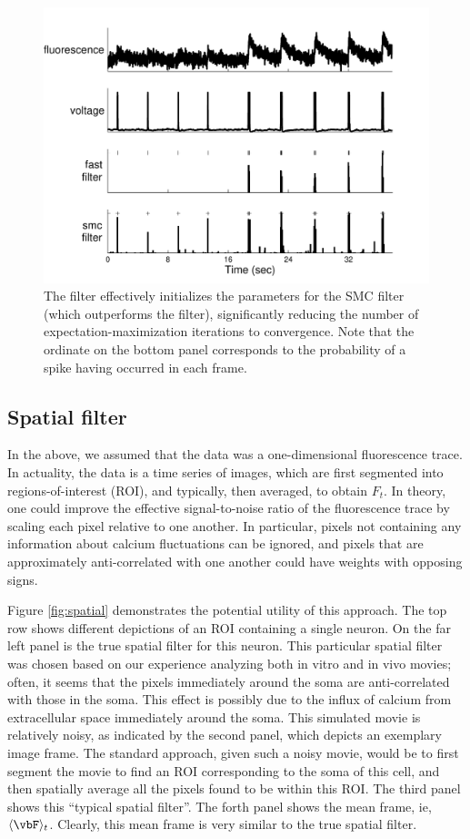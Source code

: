 \begin{figure}[h!]
\centering \includegraphics[width=.9\linewidth]{../figs/smc_init}
\caption{The \foopsi filter effectively initializes the parameters for the SMC filter (which outperforms the \foopsi filter), significantly reducing the number of expectation-maximization iterations to convergence.  Note that the ordinate on the bottom panel corresponds to the probability of a spike having occurred in each frame.} \label{fig:smc_init}
\end{figure}

\subsection{Spatial filter}

In the above, we assumed that the data was a one-dimensional fluorescence trace.  In actuality, the data is a time series of images, which are first segmented into regions-of-interest (ROI), and typically, then averaged, to obtain $F_t$.  In theory, one could improve the effective signal-to-noise ratio of the fluorescence trace by scaling each pixel relative to one another.  In particular, pixels not containing any information about calcium fluctuations can be ignored, and pixels that are approximately anti-correlated with one another could have weights with opposing signs.  

Figure \ref{fig:spatial} demonstrates the potential utility of this approach.  The top row shows different depictions of an ROI containing a single neuron.  On the far left panel is the true spatial filter for this neuron.  This particular spatial filter was chosen based on our experience analyzing both in vitro and in vivo movies; often, it seems that the pixels immediately around the soma are anti-correlated with those in the soma.  This effect is possibly due to the influx of calcium from extracellular space immediately around the soma.  This simulated movie is relatively noisy, as indicated by the second panel, which depicts an exemplary image frame.  The standard approach, given such a noisy movie, would be to first segment the movie to find an ROI corresponding to the soma of this cell, and then spatially average all the pixels found to be within this ROI.  The third panel shows this ``typical spatial filter''.  The forth panel shows the mean frame, ie, $\langle \vbF \rangle_t$.  Clearly, this mean frame is very similar to the true spatial filter.

